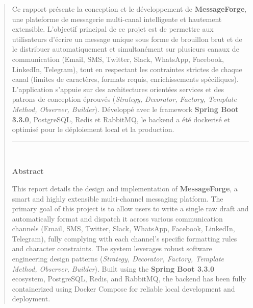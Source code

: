\begin{center}
	\begin{abstract}
	
        Ce rapport présente la conception et le développement de \textbf{MessageForge}, une plateforme de messagerie multi-canal intelligente et hautement extensible. L'objectif principal de ce projet est de permettre aux utilisateurs d'écrire un message unique sous forme de brouillon brut et de le distribuer automatiquement et simultanément sur plusieurs canaux de communication (Email, SMS, Twitter, Slack, WhatsApp, Facebook, LinkedIn, Telegram), tout en respectant les contraintes strictes de chaque canal (limites de caractères, formats requis, enrichissements spécifiques). L'application s'appuie sur des architectures orientées services et des patrons de conception éprouvés (\textit{Strategy, Decorator, Factory, Template Method, Observer, Builder}). Développé avec le framework \textbf{Spring Boot 3.3.0}, PostgreSQL, Redis et RabbitMQ, le backend a été dockerisé et optimisé pour le déploiement local et la production.
        
        \rule{\linewidth}{0.2 mm} \\[0.4 cm]
       
        \begin{center}\textbf{Abstract}\end{center} 
        
        This report details the design and implementation of \textbf{MessageForge}, a smart and highly extensible multi-channel messaging platform. The primary goal of this project is to allow users to write a single raw draft and automatically format and dispatch it across various communication channels (Email, SMS, Twitter, Slack, WhatsApp, Facebook, LinkedIn, Telegram), fully complying with each channel's specific formatting rules and character constraints. The system leverages robust software engineering design patterns (\textit{Strategy, Decorator, Factory, Template Method, Observer, Builder}). Built using the \textbf{Spring Boot 3.3.0} ecosystem, PostgreSQL, Redis, and RabbitMQ, the backend has been fully containerized using Docker Compose for reliable local development and deployment.
    \end{abstract}
\end{center}
